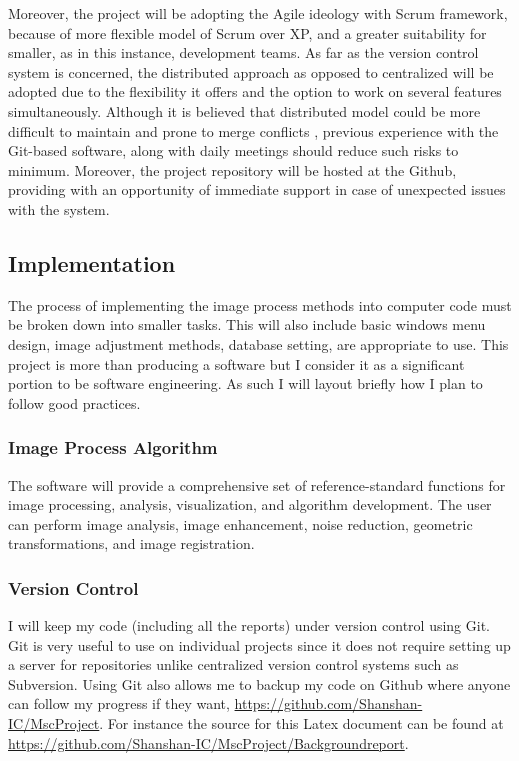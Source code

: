 \begin{itemize}
Moreover, the project will be adopting the Agile ideology \cite{Sutherland} with Scrum framework, because of more flexible model of Scrum over XP, and a greater suitability for smaller, as in this instance, development teams. As far as the version control system is concerned, the distributed approach as opposed to centralized will be adopted due to the flexibility it offers and the option to work on several features
simultaneously. Although it is believed that distributed model could be more difficult to maintain and prone to merge conflicts \cite{Hardeep}, previous experience with the Git-based software, along with daily meetings should reduce such risks to minimum. Moreover, the project repository will be hosted at the Github, providing with
an opportunity of immediate support in case of unexpected issues with the system.


\subsection{Implementation}
The process of implementing the image process methods into computer code must be broken down into smaller tasks. This will also include basic windows menu design, image adjustment methods, database setting, are appropriate to use. This project is more than producing a software but I consider it as a significant portion to be software engineering.  As such I will layout briefly how I plan to follow good practices. 

\subsubsection{Image Process Algorithm}
The software will provide a comprehensive set of reference-standard functions for image processing, analysis, visualization, and algorithm development. The user can perform image analysis, image enhancement, noise reduction, geometric transformations, and image registration. 

\subsubsection{Version Control}
I will keep my code (including all the reports) under version control using Git. Git is very useful to use on individual projects since it does not require setting up a server for repositories unlike centralized version control systems such as Subversion. Using Git also allows me to backup my code on Github where anyone can follow my progress if they want, \url{https://github.com/Shanshan-IC/MscProject}. 
For instance the source for this Latex document can be found at \url{https://github.com/Shanshan-IC/MscProject/Backgroundreport}.


\end{itemize}
